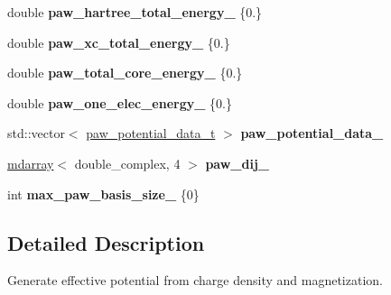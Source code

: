 \begin{DoxyCompactItemize}
\item 
\hypertarget{classsirius_1_1_potential_a6ecb8ae450a712a26dc1b91ad8348e28}{}double {\bfseries paw\+\_\+hartree\+\_\+total\+\_\+energy\+\_\+} \{0.\}\label{classsirius_1_1_potential_a6ecb8ae450a712a26dc1b91ad8348e28}

\item 
\hypertarget{classsirius_1_1_potential_a0b07d2b2ee776efdb34a64b4041ecb87}{}double {\bfseries paw\+\_\+xc\+\_\+total\+\_\+energy\+\_\+} \{0.\}\label{classsirius_1_1_potential_a0b07d2b2ee776efdb34a64b4041ecb87}

\item 
\hypertarget{classsirius_1_1_potential_a51b0a21e62d33305653555820c8e656a}{}double {\bfseries paw\+\_\+total\+\_\+core\+\_\+energy\+\_\+} \{0.\}\label{classsirius_1_1_potential_a51b0a21e62d33305653555820c8e656a}

\item 
\hypertarget{classsirius_1_1_potential_af1328b6bfd09912ade6b156476cd2752}{}double {\bfseries paw\+\_\+one\+\_\+elec\+\_\+energy\+\_\+} \{0.\}\label{classsirius_1_1_potential_af1328b6bfd09912ade6b156476cd2752}

\item 
\hypertarget{classsirius_1_1_potential_a190a0617e74f0cce2aed286680c74a17}{}std\+::vector$<$ \hyperlink{structsirius_1_1_potential_1_1paw__potential__data__t}{paw\+\_\+potential\+\_\+data\+\_\+t} $>$ {\bfseries paw\+\_\+potential\+\_\+data\+\_\+}\label{classsirius_1_1_potential_a190a0617e74f0cce2aed286680c74a17}

\item 
\hypertarget{classsirius_1_1_potential_a39bd1b7cb3db41258aa286c2ee0af3a3}{}\hyperlink{classsddk_1_1mdarray}{mdarray}$<$ double\+\_\+complex, 4 $>$ {\bfseries paw\+\_\+dij\+\_\+}\label{classsirius_1_1_potential_a39bd1b7cb3db41258aa286c2ee0af3a3}

\item 
\hypertarget{classsirius_1_1_potential_a4a556afd6462fb98e93aa0293651273a}{}int {\bfseries max\+\_\+paw\+\_\+basis\+\_\+size\+\_\+} \{0\}\label{classsirius_1_1_potential_a4a556afd6462fb98e93aa0293651273a}

\end{DoxyCompactItemize}


\subsection{Detailed Description}
Generate effective potential from charge density and magnetization. 

